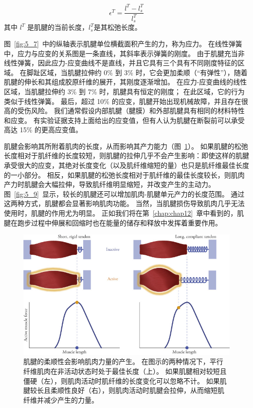 \begin{equation}
	\epsilon^T = \frac{l^T - l_s^T}{l_s^T} 
	\label{eq:5_5}
\end{equation}
% 
其中 $l^T$ 是肌腱的当前长度，$l_s^T$是其松弛长度。


图~\ref{fig:5_7}~中的纵轴表示肌腱单位横截面积产生的力，称为应力。
在线性弹簧中，应力与应变的关系图是一条直线，其斜率表示弹簧的刚度。
由于肌腱充当非线性弹簧，因此应力-应变曲线不是直线，并且它具有三个具有不同刚度特征的区域。
在脚趾区域，当肌腱拉伸约 0\% 到 3\% 时，它会更加柔顺（“有弹性”），随着肌腱的伸长和其组成胶原纤维的展开，其刚度逐渐增加。
在应力-应变曲线的线性区域，当肌腱拉伸约 3\% 到 7\% 时，肌腱具有恒定的刚度；
在此区域，它的行为类似于线性弹簧。
最后，超过 10\% 的应变，肌腱开始出现机械故障，并且存在很高的受伤风险。
我们通常假设内部肌腱（腱膜）和外部肌腱具有相同的材料特性和应变。
有实验证据支持上面给出的应变值，但有人认为肌腱在断裂前可以承受高达 15\% 的更高应变值。


肌腱会影响其所附着肌肉的长度，从而影响其产力能力（图~\ref{fig:5_8}）。
如果肌腱的松弛长度相对于肌纤维的长度较短，则肌腱的拉伸几乎不会产生影响：即使这样的肌腱承受很大的应变，其绝对长度变化（以及肌纤维缩短的量）也只是肌纤维最佳长度的一小部分。
相反，如果肌腱的松弛长度相对于肌纤维的最佳长度较长，则肌肉产力时肌腱会大幅拉伸，导致肌纤维明显缩短，并改变产生的主动力。
图~\ref{fig:5_9}~显示，较长的肌腱还可以增加肌肉-肌腱单元产力的长度范围。
通过这两种方式，肌腱都会显著影响肌肉功能。
当然，当肌腱损伤导致肌肉几乎无法使用时，肌腱的作用尤为明显。
正如我们将在第~\ref{chap:chap12}~章中看到的，肌腱在跑步过程中伸展和回缩时也在能量的储存和释放中发挥着重要作用。


\begin{figure}[!htb]
	\centering
	\includegraphics[width=1.0\linewidth]{chap5/5_8}
	\caption{肌腱的柔顺性会影响肌肉力量的产生。
		在图示的两种情况下，平行纤维肌肉在非活动状态时处于最佳长度（上）。
		如果肌腱相对较短且僵硬（左），则肌肉活动时肌纤维的长度变化可以忽略不计。
		如果肌腱较长且柔顺性良好（右），则肌肉活动时肌腱会拉伸，从而缩短肌纤维并减少产生的力量。 \label{fig:5_8}}
\end{figure}


